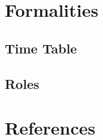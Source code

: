 \documentclass[a4paper,10pt]{article}
\begin{document}
\section{Formalities}
\subsection{Time Table}
\subsection{Roles}

\renewcommand\refname{\vskip -1cm}
\section{References}

\end{document}
